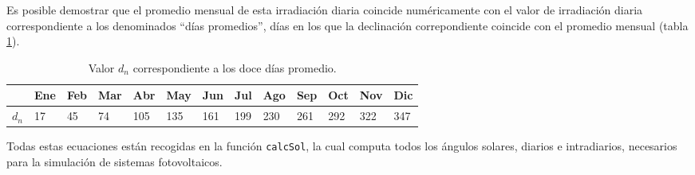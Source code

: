 Es posible demostrar que el promedio mensual de esta irradiación diaria coincide numéricamente con el valor de irradiación diaria correspondiente a los denominados ``días promedios'', días en los que la declinación correpondiente coincide con el promedio mensual (tabla \ref{tab:DiasPromedio}).
\begin{center}
{\footnotesize }%
\begin{table}[h]
{\footnotesize \caption{Valor $d_{n}$ correspondiente a los doce días promedio.\label{tab:DiasPromedio}}
}{\footnotesize \par}

\centering{}{\footnotesize }\begin{tabular}{>{\centering}p{6mm}>{\centering}m{4mm}>{\centering}m{4mm}>{\centering}m{4mm}>{\centering}m{4mm}>{\centering}m{4mm}>{\centering}m{4mm}>{\centering}m{4mm}>{\centering}m{4mm}>{\centering}m{4mm}>{\centering}m{4mm}>{\centering}m{4mm}>{\centering}m{3mm}}
\toprule 
{\footnotesize Mes} & {\footnotesize Ene} & {\footnotesize Feb} & {\footnotesize Mar} & {\footnotesize Abr} & {\footnotesize May} & {\footnotesize Jun} & {\footnotesize Jul} & {\footnotesize Ago} & {\footnotesize Sep} & {\footnotesize Oct} & {\footnotesize Nov} & {\footnotesize Dic}\tabularnewline
\midrule
$d_{n}$ & {\footnotesize 17} & {\footnotesize 45} & {\footnotesize 74} & {\footnotesize 105} & {\footnotesize 135} & {\footnotesize 161} & {\footnotesize 199} & {\footnotesize 230} & {\footnotesize 261} & {\footnotesize 292} & {\footnotesize 322} & {\footnotesize 347}\tabularnewline
\bottomrule
\end{tabular}
\end{table}

\par\end{center}{\footnotesize \par}

Todas estas ecuaciones están recogidas en la función \texttt{calcSol}, la cual computa todos los ángulos solares, diarios e intradiarios, necesarios para la simulación de sistemas fotovoltaicos.

